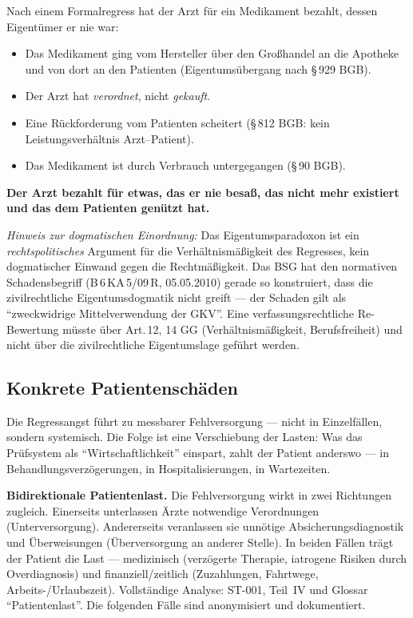 \documentclass{umbruch-position}
\begin{document}
Nach einem Formalregress hat der Arzt für ein Medikament bezahlt, dessen Eigentümer er nie war:

\begin{itemize}[nosep]
  \item Das Medikament ging vom Hersteller über den Großhandel an die Apotheke und von dort an den Patienten (Eigentumsübergang nach \S\,929 BGB).
  \item Der Arzt hat \textit{verordnet}, nicht \textit{gekauft}.
  \item Eine Rückforderung vom Patienten scheitert (\S\,812 BGB: kein Leistungsverhältnis Arzt--Patient).
  \item Das Medikament ist durch Verbrauch untergegangen (\S\,90 BGB).
\end{itemize}

\textbf{Der Arzt bezahlt für etwas, das er nie besaß, das nicht mehr existiert und das dem Patienten genützt hat.}

\textit{Hinweis zur dogmatischen Einordnung:} Das Eigentumsparadoxon ist ein \emph{rechtspolitisches} Argument für die Verhältnismäßigkeit des Regresses, kein dogmatischer Einwand gegen die Rechtmäßigkeit. Das BSG hat den normativen Schadensbegriff (B\,6\,KA\,5/09\,R, 05.05.2010) gerade so konstruiert, dass die zivilrechtliche Eigentumsdogmatik nicht greift --- der Schaden gilt als ``zweckwidrige Mittelverwendung der GKV''. Eine verfassungsrechtliche Re-Bewertung müsste über Art.\,12, 14 GG (Verhältnismäßigkeit, Berufsfreiheit) und nicht über die zivilrechtliche Eigentumslage geführt werden.


\subsection{Konkrete Patientenschäden}

Die Regressangst führt zu messbarer Fehlversorgung --- nicht in Einzelfällen, sondern systemisch. Die Folge ist eine Verschiebung der Lasten: Was das Prüfsystem als ``Wirtschaftlichkeit'' einspart, zahlt der Patient anderswo --- in Behandlungs\-verzögerungen, in Hospitalisierungen, in Wartezeiten.

\textbf{Bidirektionale Patientenlast.} Die Fehlversorgung wirkt in zwei Richtungen zugleich. Einerseits unterlassen Ärzte notwendige Verordnungen (Unterversorgung). Andererseits veranlassen sie unnötige Absicherungsdiagnostik und Überweisungen (Überversorgung an anderer Stelle). In beiden Fällen trägt der Patient die Last --- medizinisch (verzögerte Therapie, iatrogene Risiken durch Overdiagnosis) und finanziell/zeitlich (Zuzahlungen, Fahrtwege, Arbeits-/Urlaubszeit). Vollständige Analyse: ST-001, Teil~IV und Glossar ``Patientenlast''. Die folgenden Fälle sind anonymisiert und dokumentiert.
\end{document}
